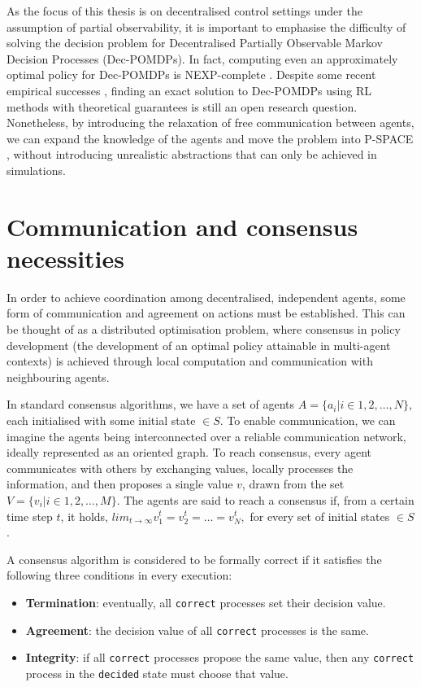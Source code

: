 \documentclass[a4paper,singleside,12pt]{report} %
\begin{document}
As the focus of this thesis is on decentralised control settings under the assumption of partial observability, it is important to emphasise the difficulty of solving the decision problem for Decentralised Partially Observable Markov Decision Processes (Dec-POMDPs). In fact, computing even an approximately optimal policy for Dec-POMDPs is NEXP-complete \cite{Bernstein2000TheCO, Rabinovich2003TheCO}. Despite some recent empirical successes \cite{Leibo2017MultiagentRL, Foerster2016LearningTC}, finding an exact solution to Dec-POMDPs using RL methods with theoretical guarantees is still an open research question. Nonetheless, by introducing the relaxation of free communication between agents, we can expand the knowledge of the agents and move the problem into P-SPACE \cite{Blondel2000ASO}, without introducing unrealistic abstractions that can only be achieved in simulations.

\section{Communication and consensus necessities}\label{communication-and-consensus-necessities}
In order to achieve coordination among decentralised, independent agents, some form of communication and agreement on actions must be established. This can be thought of as a distributed optimisation problem, where consensus in policy development (the development of an optimal policy attainable in multi-agent contexts) is achieved through local computation and communication with neighbouring agents.

In standard consensus algorithms, we have a set of agents $A=\{a_i | i \in 1, 2, \dots, N\}$, each initialised with some initial state $\in S$. To enable communication, we can imagine the agents being interconnected over a reliable communication network, ideally represented as an oriented graph. To reach consensus, every agent communicates with others by exchanging values, locally processes the information, and then proposes a single value $v$, drawn from the set $V=\{v_i | i \in 1,2, \dots, M\}$. The agents are said to reach a consensus if, from a certain time step \(t\), it holds, $lim_{t \to \infty} v_1^t = v_2^t = \dots = v_N^t,$ for every set of initial states $\in S$.

A consensus algorithm is considered to be formally correct \cite{Coulouris2012DistributedS} if it satisfies the following three conditions in every execution:

\begin{itemize}
\item \textbf{Termination}: eventually, all \texttt{correct} processes set their decision value.
\item \textbf{Agreement}: the decision value of all \texttt{correct} processes is the same.
\item \textbf{Integrity}: if all \texttt{correct} processes propose the same value, then any \texttt{correct} process in the \texttt{decided} state must choose that value.
\end{itemize}
\end{document}
